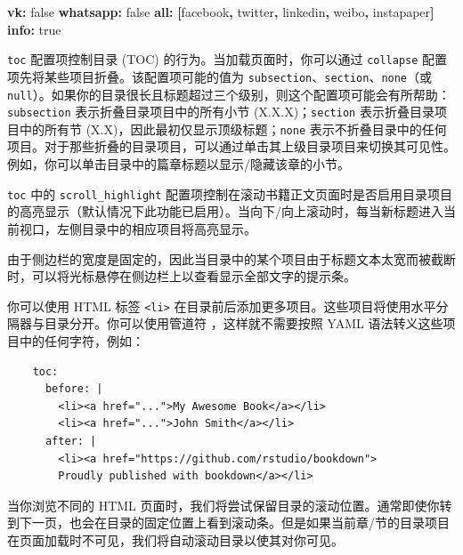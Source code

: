 \documentclass[
  12pt,
]{krantz}
\newenvironment{Shaded}{\begin{snugshade}}{\end{snugshade}}
\newcommand{\AttributeTok}[1]{\textcolor[rgb]{0.13,0.29,0.53}{#1}}
\newcommand{\CharTok}[1]{\textcolor[rgb]{0.31,0.60,0.02}{#1}}
\newcommand{\FunctionTok}[1]{\textcolor[rgb]{0.13,0.29,0.53}{\textbf{#1}}}
\newcommand{\KeywordTok}[1]{\textcolor[rgb]{0.13,0.29,0.53}{\textbf{#1}}}
\newcommand{\StringTok}[1]{\textcolor[rgb]{0.31,0.60,0.02}{#1}}
\theoremstyle{definition}
\theoremstyle{definition}
\theoremstyle{definition}
\theoremstyle{definition}
\theoremstyle{remark}
\begin{document}
\begin{Shaded}
\begin{Highlighting}[]
\AttributeTok{      }\FunctionTok{vk}\KeywordTok{:}\AttributeTok{ }\CharTok{false}
\AttributeTok{      }\FunctionTok{whatsapp}\KeywordTok{:}\AttributeTok{ }\CharTok{false}
\AttributeTok{      }\FunctionTok{all}\KeywordTok{:}\AttributeTok{ }\KeywordTok{[}\StringTok{\textquotesingle{}facebook\textquotesingle{}}\KeywordTok{,}\AttributeTok{ }\StringTok{\textquotesingle{}twitter\textquotesingle{}}\KeywordTok{,}\AttributeTok{ }\StringTok{\textquotesingle{}linkedin\textquotesingle{}}\KeywordTok{,}\AttributeTok{ }\StringTok{\textquotesingle{}weibo\textquotesingle{}}\KeywordTok{,}\AttributeTok{ }\StringTok{\textquotesingle{}instapaper\textquotesingle{}}\KeywordTok{]}
\AttributeTok{    }\FunctionTok{info}\KeywordTok{:}\AttributeTok{ }\CharTok{true}
\end{Highlighting}
\end{Shaded}

\texttt{toc} 配置项控制目录 (TOC) 的行为。当加载页面时，你可以通过 \texttt{collapse} 配置项先将某些项目折叠。该配置项可能的值为 \texttt{subsection}、\texttt{section}、\texttt{none}（或 \texttt{null}）。如果你的目录很长且标题超过三个级别，则这个配置项可能会有所帮助：\texttt{subsection} 表示折叠目录项目中的所有小节 (X.X.X)；\texttt{section} 表示折叠目录项目中的所有节 (X.X)，因此最初仅显示顶级标题；\texttt{none} 表示不折叠目录中的任何项目。对于那些折叠的目录项目，可以通过单击其上级目录项目来切换其可见性。例如，你可以单击目录中的篇章标题以显示/隐藏该章的小节。

\texttt{toc} 中的 \texttt{scroll\_highlight} 配置项控制在滚动书籍正文页面时是否启用目录项目的高亮显示（默认情况下此功能已启用）。当向下/向上滚动时，每当新标题进入当前视口，左侧目录中的相应项目将高亮显示。

由于侧边栏的宽度是固定的，因此当目录中的某个项目由于标题文本太宽而被截断时，可以将光标悬停在侧边栏上以查看显示全部文字的提示条。

你可以使用 HTML 标签 \texttt{\textless{}li\textgreater{}} 在目录前后添加更多项目。这些项目将使用水平分隔器与目录分开。你可以使用管道符 \texttt{\textbar{}}，这样就不需要按照 YAML 语法转义这些项目中的任何字符，例如：

\begin{verbatim}
    toc:
      before: |
        <li><a href="...">My Awesome Book</a></li>
        <li><a href="...">John Smith</a></li>
      after: |
        <li><a href="https://github.com/rstudio/bookdown">
        Proudly published with bookdown</a></li>
\end{verbatim}

当你浏览不同的 HTML 页面时，我们将尝试保留目录的滚动位置。通常即使你转到下一页，也会在目录的固定位置上看到滚动条。但是如果当前章/节的目录项目在页面加载时不可见，我们将自动滚动目录以使其对你可见。
\end{document}
